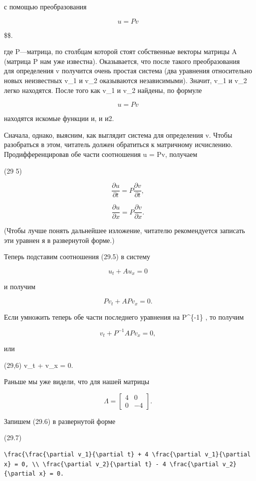 \documentclass[
  ukrainian,
]{article}
\begin{document}
с помощью преобразования

\[
u = Pv
\]

\$\$.

где P---матрица, по столбцам которой стоят собственные векторы матрицы A
(матрица P нам уже известна). Оказывается, что после такого
преобразования для определения v получится очень простая система (два
уравнения относительно новых неизвестных v\_1 и v\_2 оказываются
независимыми). Значит, v\_1 и v\_2 легко находятся. После того как v\_1
и v\_2 найдены, по формуле

\[
u = Pv
\]

находятся искомые функции и, и и2.

Сначала, однако, выясним, как выглядит система для определения v. Чтобы
разобраться в этом, читатель должен обратиться к матричному исчислению.
Продифференцировав обе части соотношения u = Pv, получаем

(29 5)

\[
\frac{\partial u}{\partial t} = P \frac{\partial v}{\partial t},
\]

\[
\frac{\partial u}{\partial x} = P \frac{\partial v}{\partial x}.
\]

(Чтобы лучше понять дальнейшее изложение, читателю рекомендуется
записать эти уравнен я в развернутой форме.)

Теперь подставим соотношения (29.5) в систему

\[
u_t + Au_x = 0
\]

и получим

\[
Pv_t + APv_x = 0.
\]

Если умножить теперь обе части последнего уравнения на P\^{}\{-1\} , то
получим

\[
v_t + P^{-1}APv_x = 0,
\]

или

(29,6) v\_t +  v\_x = 0.

Раньше мы уже видели, что для нашей матрицы

\[
\Lambda = \begin{bmatrix} 4 & 0 \\ 0 & -4 \end{bmatrix}.
\]

Запишем (29.6) в развернутой форме

(29.7)

\begin{verbatim}
\frac{\frac{\partial v_1}{\partial t} + 4 \frac{\partial v_1}{\partial x} = 0, \\ \frac{\partial v_2}{\partial t} - 4 \frac{\partial v_2}{\partial x} = 0.
\end{verbatim}
\end{document}
